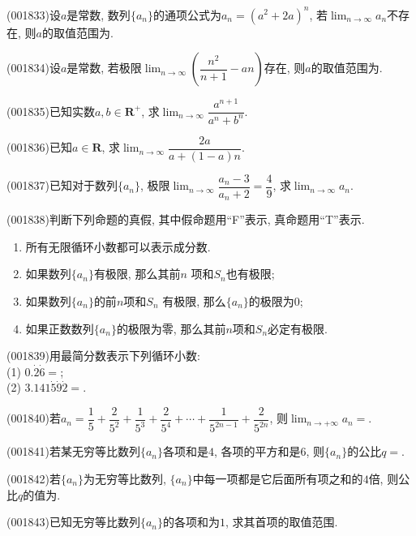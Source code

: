 \item (001833)设$a$是常数, 数列$\{a_n\}$的通项公式为$a_n=(a^2+2a)^n$, 若$\displaystyle\lim_{n\rightarrow \infty} a_n$不存在, 则$a$的取值范围为.
\item (001834)设$a$是常数, 若极限$\displaystyle\lim_{n\rightarrow \infty} \left(\dfrac{n^2}{n+1}-an\right)$存在, 则$a$的取值范围为.
\item (001835)已知实数$a,b\in \mathbf{R}^+$, 求$\displaystyle\lim_{n\rightarrow \infty} \dfrac{a^{n+1}}{a^n+b^n}$.
\item (001836)已知$a\in \mathbf{R}$, 求$\displaystyle\lim_{n\rightarrow \infty}\dfrac{2a}{a+(1-a)n}$.
\item (001837)已知对于数列$\{a_n\}$, 极限$\displaystyle\lim_{n\rightarrow \infty} \dfrac{a_n-3}{a_n+2}=\dfrac{4}{9}$, 求$\displaystyle\lim_{n\rightarrow \infty} a_n$.
\item (001838)判断下列命题的真假, 其中假命题用``F''表示, 真命题用``T''表示.\\ 
\begin{enumerate}[\blank{20}(1)]
\item 所有无限循环小数都可以表示成分数.\\ 
\item 如果数列$\{a_n\}$有极限, 那么其前$n$ 项和$S_n$也有极限;\\ 
\item 如果数列$\{a_n\}$的前$n$项和$S_n$ 有极限, 那么$\{a_n\}$的极限为$0$;\\ 
\item 如果正数数列$\{a_n\}$的极限为零, 那么其前$n$项和$S_n$必定有极限.\\ 
\end{enumerate}
\item (001839)用最简分数表示下列循环小数:\\ 
(1) $0.\dot{2}\dot{6}=$;\\ 
(2) $3.141\dot{5}\dot{9}\dot{2}=$.
\item (001840)若$a_n=\dfrac{1}{5}+\dfrac{2}{5^2}+\dfrac{1}{5^3}+\dfrac{2}{5^4}+\cdots+\dfrac{1}{5^{2n-1}}+\dfrac{2}{5^{2n}}$, 则$\displaystyle\lim_{n\rightarrow +\infty} a_n=$.
\item (001841)若某无穷等比数列$\{a_n\}$各项和是$4$, 各项的平方和是$6$, 则$\{a_n\}$的公比$q=$.
\item (001842)若$\{a_n\}$为无穷等比数列, $\{a_n\}$中每一项都是它后面所有项之和的$4$倍, 则公比$q$的值为.
\item (001843)已知无穷等比数列$\{a_n\}$的各项和为$1$, 求其首项的取值范围.
